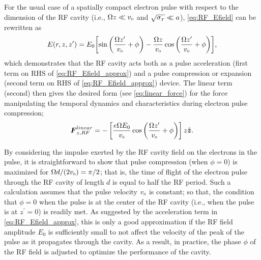 For the usual case of a spatially compact electron pulse with respect to the dimension of the RF cavity (i.e., $ \Omega z \ll v_{{\scriptscriptstyle 0}} $ and $ \sqrt{\sigma_{{\scriptscriptstyle T}}} \ll a $), \ref{eq:RF_Efield} can be rewritten as
\begin{equation} \label{eq:RF_Efield_approx}
  E ( r , z , z^{\prime} ) = E_{0} \biggl [ \sin \left ( \frac{ \Omega z^{\prime} }{ v_{{\scriptscriptstyle 0}} } + \phi \right ) - \frac{ \Omega z }{ v_{{\scriptscriptstyle 0}} } \cos \left ( \frac{ \Omega z^{\prime} }{ v_{{\scriptscriptstyle 0}} } + \phi \right ) \biggr ] \text{,}
\end{equation}
which demonstrates that the RF cavity acts both as a pulse acceleration (first term on RHS of \ref{eq:RF_Efield_approx}) and a pulse compression or expansion (second term on RHS of \eqref{eq:RF_Efield_approx}) device. %
The linear term (second) then gives the desired form (see \ref{eq:linear_force}) for the force manipulating the temporal dynamics and characteristics during electron pulse compression;
\begin{equation} \label{eq:RF_Force_z}
  \boldsymbol{F}_{ z , RF }^{linear} = - \left [ \frac{ e \Omega E_{0} }{ v_{{\scriptscriptstyle 0}} } \cos \left ( \frac{ \Omega z^{\prime} }{ v_{{\scriptscriptstyle 0}} } + \phi \right ) \right ] z \hat{\operatorname{ \boldsymbol{z} }} \text{.}
\end{equation}

By considering the impulse exerted by the RF cavity field on the electrons in the pulse, it is straightforward to show that pulse compression (when $\phi = 0$) is maximized for $ \Omega d / (2 v_{{\scriptscriptstyle 0}} ) = \pi /2 $; that is, the time of flight of the electron pulse through the RF cavity of length $ d $ is equal to half the RF period.
Such a calculation assumes that the pulse velocity $v_{{\scriptscriptstyle 0}}$ is constant; so that, the condition that $ \phi = 0 $ when the pulse is at the center of the RF cavity (i.e., when the pulse is at $ z^{\prime} = 0 $) is readily met.
As suggested by the acceleration term in \ref{eq:RF_Efield_approx}, this is only a good approximation if the RF field amplitude $E_{0}$ is sufficiently small to not affect the velocity of the peak of the pulse as it propagates through the cavity.
As a result, in practice, the phase $\phi$ of the RF field is adjusted to optimize the performance of the cavity.


